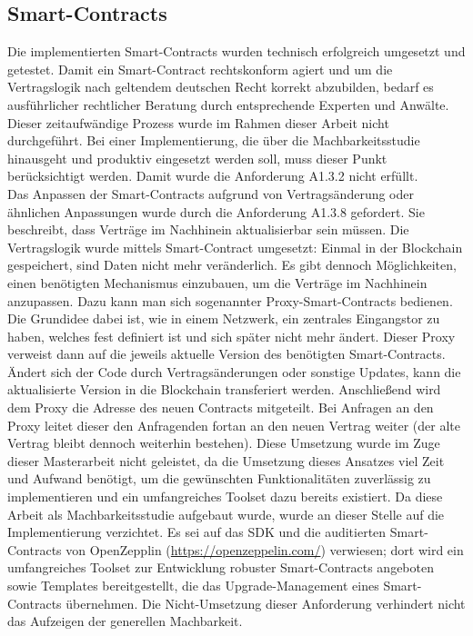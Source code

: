 \subsection{Smart-Contracts}
\label{subsec:implementation:requirements:smart_contracts}
Die implementierten Smart-Contracts wurden technisch erfolgreich umgesetzt und getestet. Damit ein Smart-Contract rechtskonform agiert und um die Vertragslogik nach geltendem deutschen Recht korrekt abzubilden, bedarf es ausführlicher rechtlicher Beratung durch entsprechende Experten und Anwälte. Dieser zeitaufwändige Prozess wurde im Rahmen dieser Arbeit nicht durchgeführt. Bei einer Implementierung, die über die Machbarkeitsstudie hinausgeht und produktiv eingesetzt werden soll, muss dieser Punkt berücksichtigt werden. Damit wurde die Anforderung A1.3.2 nicht erfüllt.\\
Das Anpassen der Smart-Contracts aufgrund von Vertragsänderung oder ähnlichen Anpassungen wurde durch die Anforderung A1.3.8 gefordert. Sie beschreibt, dass Verträge im Nachhinein aktualisierbar sein müssen. Die Vertragslogik wurde mittels Smart-Contract umgesetzt: Einmal in der Blockchain gespeichert, sind Daten nicht mehr veränderlich. Es gibt dennoch Möglichkeiten, einen benötigten Mechanismus einzubauen, um die Verträge im Nachhinein anzupassen. Dazu kann man sich sogenannter Proxy-Smart-Contracts bedienen. Die Grundidee dabei ist, wie in einem Netzwerk, ein zentrales Eingangstor zu haben, welches fest definiert ist und sich später nicht mehr ändert. Dieser Proxy verweist dann auf die jeweils aktuelle Version des benötigten Smart-Contracts. Ändert sich der Code durch Vertragsänderungen oder sonstige Updates, kann die aktualisierte Version in die Blockchain transferiert werden. Anschließend wird dem Proxy die Adresse des neuen Contracts mitgeteilt. Bei Anfragen an den Proxy leitet dieser den Anfragenden fortan an den neuen Vertrag weiter (der alte Vertrag bleibt dennoch weiterhin bestehen). Diese Umsetzung wurde im Zuge dieser Masterarbeit nicht geleistet, da die Umsetzung dieses Ansatzes viel Zeit und Aufwand benötigt, um die gewünschten Funktionalitäten zuverlässig zu implementieren und ein umfangreiches Toolset dazu bereits existiert. Da diese Arbeit als Machbarkeitsstudie aufgebaut wurde, wurde an dieser Stelle auf die Implementierung verzichtet. Es sei auf das \ac{SDK} und die auditierten Smart-Contracts von OpenZepplin (\url{https://openzeppelin.com/}) verwiesen; dort wird ein umfangreiches Toolset zur Entwicklung robuster Smart-Contracts angeboten sowie Templates bereitgestellt, die das Upgrade-Management eines Smart-Contracts übernehmen. Die Nicht-Umsetzung dieser Anforderung verhindert nicht das Aufzeigen der generellen Machbarkeit.\\


